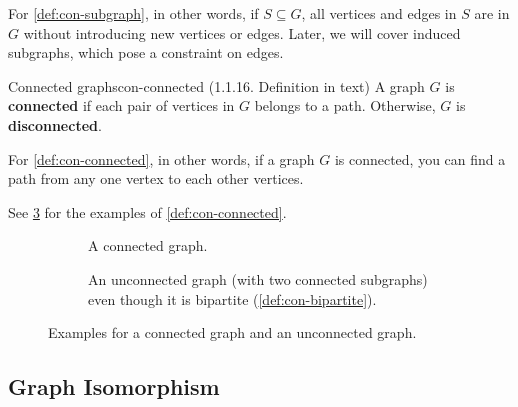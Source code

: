 \documentclass[../src/handouts/main.tex]{subfiles}
\begin{document}
For \cref{def:con-subgraph}, in other words, if $S \subseteq G$, all vertices and edges in $S$ are in $G$ without introducing new vertices or edges. Later, we will cover induced subgraphs, which pose a constraint on edges. %

\begin{definition}{Connected graphs}{con-connected}
  (1.1.16. Definition in text)
  A graph $G$ is \textbf{connected} if each pair of vertices in $G$ belongs to a path. Otherwise, $G$ is \textbf{disconnected}.
\end{definition}

For \cref{def:con-connected}, in other words, if a graph $G$ is connected, you can find a path from any one vertex to each other vertices. %

See \cref{fig:con-connected-unconnected} for the examples of \cref{def:con-connected}.

\begin{figure}[ht]
  \centering
  \begin{subfigure}[t]{.4\textwidth}
    \centering
    \tripartitegraph
    \caption{A connected graph.}
    \label{fig:con-connected}
  \end{subfigure}
  \begin{subfigure}[t]{.4\textwidth}
    \centering
    \bipartitegraph
    \caption{An unconnected graph (with two connected subgraphs) even though it is bipartite (\cref{def:con-bipartite}).}
    \label{fig:con-unconnected}
  \end{subfigure}
  \caption{Examples for a connected graph and an unconnected graph.}
  \label{fig:con-connected-unconnected}
\end{figure}

\subsection{Graph Isomorphism}\label{subsec:con-graph-isomorphism}
\end{document}

